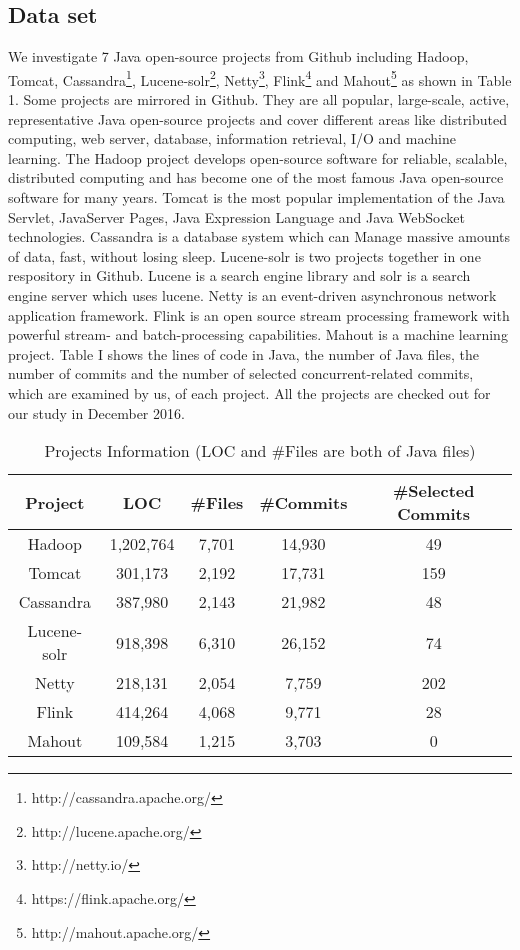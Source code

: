 \subsection{Data set}
\label{sec:method:data}
We investigate 7 Java open-source projects from Github including Hadoop, Tomcat, Cassandra\footnote{http://cassandra.apache.org/}, Lucene-solr\footnote{http://lucene.apache.org/}, Netty\footnote{http://netty.io/}, Flink\footnote{https://flink.apache.org/} and Mahout\footnote{http://mahout.apache.org/} as shown in Table 1. Some projects are mirrored in Github. They are all popular, large-scale, active, representative Java open-source projects and cover different areas like distributed computing, web server, database, information retrieval, I/O and machine learning. The Hadoop project develops open-source software for reliable, scalable, distributed computing and has become one of the most famous Java open-source software for many years. Tomcat is the most popular implementation of the Java Servlet, JavaServer Pages, Java Expression Language and Java WebSocket technologies. Cassandra \cite{journals/sigops/LakshmanM10} is a database system which can Manage massive amounts of data, fast, without losing sleep. Lucene-solr is two projects together in one respository in Github. Lucene is a search engine library and solr is a search engine server which uses lucene. Netty is an event-driven asynchronous network application framework. Flink is an open source stream processing framework with powerful stream- and batch-processing capabilities. Mahout is a machine learning project. Table I shows the lines of code in Java, the number of Java files, the number of commits and the number of selected concurrent-related commits, which are examined by us, of each project. All the projects are checked out for our study in December 2016.

\begin{table}
	\centering
	\caption{Projects Information (LOC and \#Files are both of Java files)}
	\begin{tabular}{|c|c|c|c|c|}\hline
		Project&LOC&\#Files&\#Commits&\#Selected Commits\\\hline
		Hadoop&1,202,764&7,701&14,930&49\\\hline
		Tomcat&301,173&2,192&17,731&159\\\hline
		Cassandra&387,980&2,143&21,982&48\\\hline
		Lucene-solr&918,398&6,310&26,152&74\\\hline
		Netty&218,131&2,054&7,759&202\\\hline
		Flink&414,264&4,068&9,771&28\\\hline
		Mahout&109,584&1,215&3,703&0\\\hline
	\end{tabular}
\end{table}


